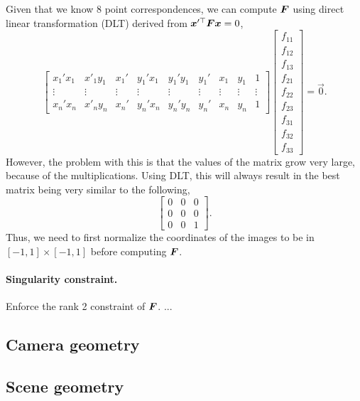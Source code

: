Given that we know 8 point correspondences, we can compute $\bm{F}$ using
direct linear transformation (DLT) derived from
$\bm{x}'^\top\bm{F}\bm{x}=0$, \[
  \begin{bmatrix}
    x_1'x_1 & x'_1y_1 & x_1' & y_1'x_1 & y_1'y_1 & y_1' & x_1 & y_1 & 1 \\
    \vdots & \vdots & \vdots & \vdots & \vdots & \vdots & \vdots & \vdots & \vdots \\
    x_n'x_n & x'_ny_n & x_n' & y_n'x_n & y_n'y_n & y_n' & x_n & y_n & 1
  \end{bmatrix}
  \begin{bmatrix}
    f_{11} \\
    f_{12} \\
    f_{13} \\
    f_{21} \\
    f_{22} \\
    f_{23} \\
    f_{31} \\
    f_{32} \\
    f_{33}
  \end{bmatrix}
  = \vec{0}
.\]
However, the problem with this is that the values of the matrix grow very
large, because of the multiplications. Using DLT, this will always result in
the best matrix being very similar to the following, \[
  \begin{bmatrix}
    0 & 0 & 0 \\
    0 & 0 & 0 \\
    0 & 0 & 1
  \end{bmatrix}
.\]
Thus, we need to first normalize the coordinates of the images to be in $[-1,
1]\times[-1, 1]$ before computing $\bm{F}$.

\paragraph{Singularity constraint.}

Enforce the rank 2 constraint of $\bm{F}$. ...

\subsection{Camera geometry}

\subsection{Scene geometry}
